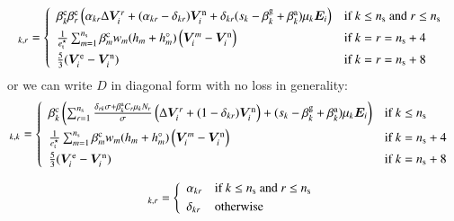 \documentclass{warpdoc}
\newcommand{\alb}{\vspace{0.1cm}\\} %
\newcommand{\ns}{{n_{\rm s}}}
\renewcommand{\vec}[1]{\bm{#1}}
\begin{document}
%
%
\begin{equation}
  [D_i]_{k,r}=\left\{\begin{array}{ll}
        \beta_k^{\rm c}\beta_r^{\rm c} \left(
\alpha_{kr}\Delta \vec{V}_i^r+ (\alpha_{kr}-\delta_{kr})\vec{V}_i^{\rm n}+\delta_{kr}(s_k-\beta_k^{\rm g}+ \beta^{\rm a}_k) \mu_k  \vec{E}_i\right) &\textrm{if $k\le \ns$ and $r \le \ns$} \alb
        \frac{1}{e_{\rm t}^\star} \sum_{m=1}^\ns \beta_m^{\rm c} w_m (h_m+h_m^\circ) \left(\vec{V}_i^{m}-\vec{V}_i^{\rm n}\right)  &\textrm{if $k=r=\ns+4$ } \alb
        \frac{5}{3}(\vec{V}_i^{\rm e}-\vec{V}_i^{\rm n}) &\textrm{if $k=r=\ns+8$}
             \end{array}  \right.
\end{equation}
%
or we can write $D$ in diagonal form with no loss in generality:
%
\begin{equation}
  [D_i]_{k,k}=\left\{\begin{array}{ll}
        \beta_k^{\rm c} \left(\sum_{r=1}^\ns \frac{\delta_{rk}\sigma+\beta_k^{\rm a} C_r  \mu_k N_r}{\sigma} \left(\Delta \vec{V}_i^r +(1-\delta_{kr})\vec{V}^{\rm n}_i\right)  +(s_k-\beta_k^{\rm g}+ \beta^{\rm a}_k) \mu_k  \vec{E}_i\right) &\textrm{if $k\le \ns$ } \alb
        \frac{1}{e_{\rm t}^\star} \sum_{m=1}^\ns \beta_m^{\rm c} w_m (h_m+h_m^\circ) \left(\vec{V}_i^{m}-\vec{V}_i^{\rm n}\right)  &\textrm{if $k=\ns+4$ } \alb
        \frac{5}{3}(\vec{V}_i^{\rm e}-\vec{V}_i^{\rm n}) &\textrm{if $k=\ns+8$}
             \end{array}  \right.
\end{equation}
%


%
\begin{equation}
  [Z]_{k,r}=\left\{\begin{array}{ll}
         \alpha_{kr} &\textrm{if $k\le \ns$ and $r \le \ns$} \alb
         \delta_{kr} &\textrm{otherwise}
             \end{array}  \right.
\end{equation}
%
\end{document}
